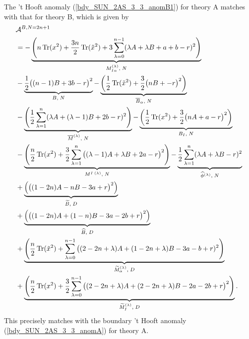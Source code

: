 \documentclass[12pt]{article}
\newcommand{\Acal}{\mathcal{A}}
\DeclareMathOperator*{\Tr}{{\rm Tr}}
\numberwithin{equation}{section}
\begin{document}
The 't Hooft anomaly (\ref{bdy_SUN_2AS_3_3_anomB1}) for theory A matches with that for theory B, 
which is given by
\begin{align}
\label{bdy_SUN_2AS_3_3_anomB2}
&
\Acal^{B, N=2n+1}
\nonumber\\
&= - \underbrace{\left( n\Tr(x^2) + \frac{3n}{2} \Tr(\tilde{x}^2) + 3\sum_{\lambda = 0}^{n-1} (\lambda A + \lambda B + a + b - r)^2 \right)}_{M_{I \alpha}^{(\lambda)}, \; N}
\nonumber \\
 & - \underbrace{\frac{1}{2}\big( (n-1)B + 3b - r \big)^2}_{B, \; N}
 - \underbrace{\left( \frac{1}{2} \Tr(\tilde{x}^2) + \frac{3}{2}\big( nB +  - r \big)^2 \right)}_{\overline{B}_{\alpha}, \; N}
  \nonumber \\
 & - \underbrace{\left( \frac{1}{2} \sum_{\lambda = 1}^{n} (\lambda A + (\lambda - 1)B + 2b - r)^2 \right)}_{\overline{M}^{(\lambda)}, \; N}
  - \underbrace{\left( \frac{1}{2} \Tr(x^2) + \frac{3}{2}\big( nA + a - r \big)^2 \right)}_{B_I, \; N}
  \nonumber \\
  & - \underbrace{\left( \frac{n}{2} \Tr(x^2) + \frac{3}{2} \sum_{\lambda = 1}^{n} \big( (\lambda - 1)A + \lambda B + 2a - r \big)^2 \right)}_{M^{I \; (\lambda)}, \; N}
  - \underbrace{\frac{1}{2} \sum_{\lambda = 1}^{n} (\lambda A + \lambda B - r)^2}_{\widehat{\phi}^{(\lambda)}, \; N}
  \nonumber \\
 & + \underbrace{\left( \big( (1-2n)A - nB - 3a + r \big)^2 \right)}_{\widetilde{B}, \; D}
  \nonumber \\
  & + \underbrace{\left( \big( (1-2n)A + (1-n)B - 3a - 2b + r \big)^2 \right)}_{\widehat{B}, \; D}
  \nonumber \\
 & + \underbrace{\left( \frac{n}{2} \Tr(\tilde{x}^2) + \sum_{\lambda = 0}^{n-1} \big( (2-2n+\lambda)A + (1-2n+\lambda)B - 3a - b + r)^2 \right)}_{\widetilde{M}_{\alpha}^{(\lambda)}, \; D}
  \nonumber \\
  & + \underbrace{\left( \frac{n}{2} \Tr(x^2) + \frac{3}{2} \sum_{\lambda = 0}^{n-1} \big( (2-2n+\lambda)A + (2-2n+\lambda)B - 2a - 2b + r \big)^2 \right)}_{\widetilde{M}_I^{(\lambda)}, \; D}. 
\end{align}
This precisely matches with the boundary 't Hooft anomaly (\ref{bdy_SUN_2AS_3_3_anomA}) for theory A. 
\end{document}
